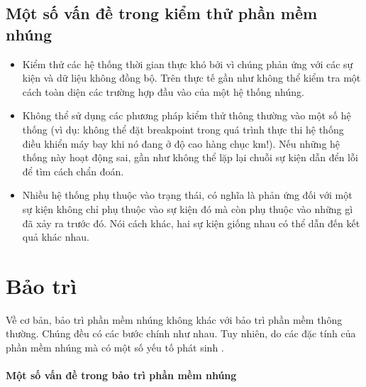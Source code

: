         \subsection{Một số vấn đề trong kiểm thử phần mềm nhúng}
            \begin{itemize}
                \item Kiểm thử các hệ thống thời gian thực khó bởi vì chúng
                    phản ứng với các sự kiện và dữ liệu không đồng bộ. Trên
                    thực tế gần như không thể kiểm tra một cách toàn diện các
                    trường hợp đầu vào của một hệ thống nhúng.

                \item Không thể sử dụng các phương pháp kiểm thử thông thường
                    vào một số hệ thống (vì dụ: không thể đặt breakpoint trong
                    quá trình thực thi hệ thống điều khiển máy bay khi nó đang
                    ở độ cao hàng chục km!). Nếu những hệ thống này hoạt động
                    sai, gần như không thể lặp lại chuỗi sự kiện dẫn đển lỗi để
                    tìm cách chẩn đoán.

                \item Nhiều hệ thống phụ thuộc vào trạng thái, có nghĩa là phản
                    ứng đối với một sự kiện không chỉ phụ thuộc vào sự kiện đó
                    mà còn phụ thuộc vào những gì đã xảy ra trước đó. Nói cách
                    khác, hai sự kiện giống nhau có thể dẫn đến kết quả khác
                    nhau.
            \end{itemize}

    \section{Bảo trì}
        Về cơ bản, bảo trì phần mềm nhúng không khác với bảo trì phần mềm thông
        thường. Chúng đều có các bước chính như nhau. Tuy nhiên, do các đặc
        tính của phần mềm nhúng mà có một số yếu tố phát sinh \cite{EmbMtn}.

        \paragraph{Một số vấn đề trong bảo trì phần mềm nhúng}
            
